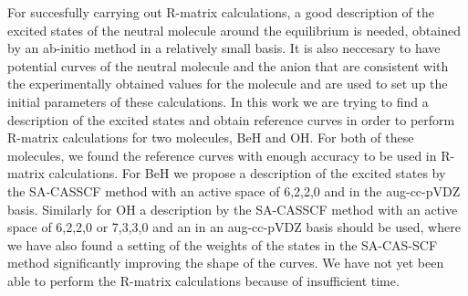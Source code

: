For succesfully carrying out R-matrix calculations, a good description of the excited states of the neutral molecule around the equilibrium is needed, obtained by an ab-initio method in a relatively small basis. It is also neccesary to have potential curves of the neutral molecule and the anion that are consistent with the experimentally obtained values for the molecule and are used to set up the initial parameters of these calculations.
In this work
we are trying to find a description of the excited states and obtain reference curves in order to perform R-matrix calculations for two molecules, BeH and OH.
For both of these molecules, we found the reference curves with enough accuracy to be 
used in R-matrix calculations. For BeH we propose a description of the excited states by 
the SA-CASSCF method with an active space of 6,2,2,0 and in the aug-cc-pVDZ basis. 
Similarly for OH a description by the SA-CASSCF method with an active space of 6,2,2,0 or 
7,3,3,0 and an in an aug-cc-pVDZ basis should be used,
where we have also found a setting of the weights of the states in the SA-CAS-SCF method 
significantly improving the shape of the curves.
We have not yet been able to perform the R-matrix calculations because of insufficient 
time.
